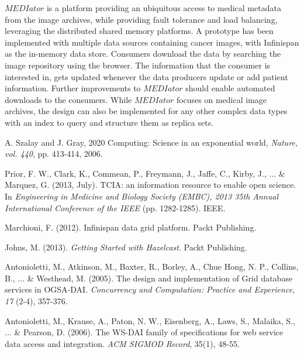 \documentclass[letterpaper, 10 pt, conference]{ieeeconf}  %
\begin{document}
$MEDIator$ is a platform providing an ubiquitous access to medical metadata from the image archives, while providing fault tolerance and load balancing, leveraging the distributed shared memory platforms. A prototype has been implemented with multiple data sources containing cancer images, with Infinispan as the in-memory data store. Consumers download the data by searching the image repository using the browser. The information that the consumer is interested in, gets updated whenever the data producers update or add patient information. Further improvements to $MEDIator$ should enable automated downloads to the consumers. While $MEDIator$ focuses on medical image archives, the design can also be implemented for any other complex data types with an index to query and structure them as replica sets.



\begin{thebibliography}{99}
		
		 A. Szalay and J. Gray, 2020 Computing: Science in an exponential world, {\em Nature, vol. 440}, pp. 413-414, 2006.
		
		 Prior, F. W., Clark, K., Commean, P., Freymann, J., Jaffe, C., Kirby, J., ... \& Marquez, G. (2013, July). TCIA: an information resource to enable open science. In {\em Engineering in Medicine and Biology Society (EMBC), 2013 35th Annual International Conference of the IEEE} (pp. 1282-1285). IEEE.
				
		 Marchioni, F. (2012). Infinispan data grid platform. Packt Publishing.
				
		 Johns, M. (2013). {\em Getting Started with Hazelcast}. Packt Publishing.
						
		 Antonioletti, M., Atkinson, M., Baxter, R., Borley, A., Chue Hong, N. P., Collins, B., ... \& Westhead, M. (2005). The design and implementation of Grid database services in OGSA-DAI. {\em  Concurrency and Computation: Practice and Experience, 17} (2-4), 357-376.
		
		 Antonioletti, M., Krause, A., Paton, N. W., Eisenberg, A., Laws, S., Malaika, S., ... \& Pearson, D. (2006). The WS-DAI family of specifications for web service data access and integration. {\em ACM SIGMOD Record}, 35(1), 48-55.
		
\end{thebibliography}
\end{document}
